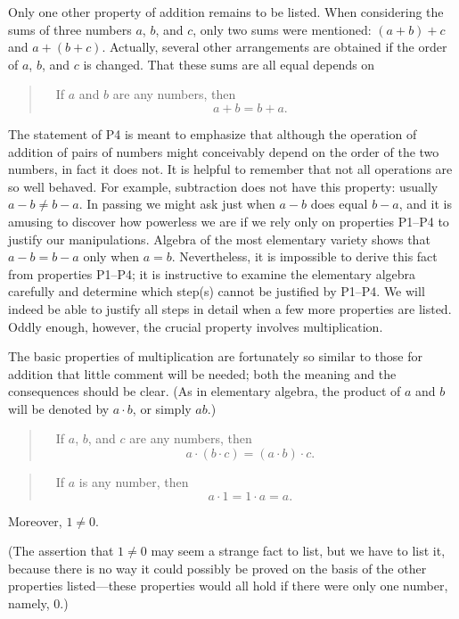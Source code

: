 Only one other property of addition remains to be listed. When considering
the sums of three numbers $a$, $b$, and $c$, only two sums were mentioned:
$(a+b)+c$ and $a+(b+c)$. Actually, several other arrangements are obtained if
the order of $a$, $b$, and $c$ is changed. That these sums are all equal
depends on

\begin{quote}
\ \ If $a$ and $b$ are any numbers, then
\[ a + b = b + a. \]
\end{quote}

The statement of P4 is meant to emphasize that although the operation of
addition of pairs of numbers might conceivably depend on the order of the two
numbers, in fact it does not. It is helpful to remember that not all
operations are so well behaved. For example, subtraction does not have this
property: usually $a-b \neq b-a$. In passing we might ask just when $a-b$ does
equal $b-a$, and it is amusing to discover how powerless we are if we rely
only on properties P1--P4 to justify our manipulations. Algebra of the most
elementary variety shows that $a-b=b-a$ only when $a=b$. Nevertheless, it is
impossible to derive this fact from properties P1--P4; it is instructive to
examine the elementary algebra carefully and determine which step(s) cannot
be justified by P1--P4. We will indeed be able to justify all steps in detail
when a few more properties are listed. Oddly enough, however, the crucial
property involves multiplication.

The basic properties of multiplication are fortunately so similar to those
for addition that little comment will be needed; both the meaning and the
consequences should be clear. (As in elementary algebra, the product of $a$
and $b$ will be denoted by $a \cdot b$, or simply $ab$.)

\begin{quote}
\ \ If $a$, $b$, and $c$ are any numbers, then
\[ a \cdot (b \cdot c) = (a \cdot b) \cdot c. \]
\end{quote}

\begin{quote}
\ \ If $a$ is any number, then
\[ a \cdot 1 = 1 \cdot a = a. \]
\end{quote}

Moreover, $1 \neq 0$.

(The assertion that $1 \neq 0$ may seem a strange fact to list, but we have
to list it, because there is no way it could possibly be proved on the basis
of the other properties listed---these properties would all hold if there
were only one number, namely, $0$.)

